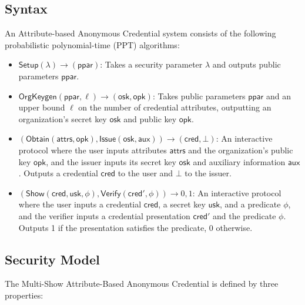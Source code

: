 \subsection{Syntax}
\begin{definition}\label{chap2_abc_system_definition}
An Attribute-based Anonymous Credential system consists of the following probabilistic polynomial-time (PPT) algorithms:
\begin{itemize}
\item $\mathsf{Setup}(\lambda) \to (\mathsf{ppar})$: Takes a security parameter $\lambda$ and outputs public parameters $\mathsf{ppar}$.

\item $\mathsf{OrgKeygen}(\mathsf{ppar}, \ell) \to (\mathsf{osk}, \mathsf{opk})$: Takes public parameters $\mathsf{ppar}$ and an upper bound $\ell$ on the number of credential attributes, outputting an organization's secret key $\mathsf{osk}$ and public key $\mathsf{opk}$.

\item $(\mathsf{Obtain}(\mathsf{attrs}, \mathsf{opk}), \mathsf{Issue}(\mathsf{osk}, \mathsf{aux})) \to (\mathsf{cred}, \bot)$: An interactive protocol where the user inputs attributes $\mathsf{attrs}$ and the organization's public key $\mathsf{opk}$, and the issuer inputs its secret key $\mathsf{osk}$ and auxiliary information $\mathsf{aux}$. Outputs a credential $\mathsf{cred}$ to the user and $\bot$ to the issuer.

\item $(\mathsf{Show}(\mathsf{cred}, \mathsf{usk}, \phi), \mathsf{Verify}(\mathsf{cred}', \phi)) \to {0,1}$: An interactive protocol where the user inputs a credential $\mathsf{cred}$, a secret key $\mathsf{usk}$, and a predicate $\phi$, and the verifier inputs a credential presentation $\mathsf{cred}'$ and the predicate $\phi$. Outputs 1 if the presentation satisfies the predicate, 0 otherwise.
\end{itemize}
\end{definition}

\subsection{Security Model}

The Multi-Show Attribute-Based Anonymous Credential is defined by three properties:

